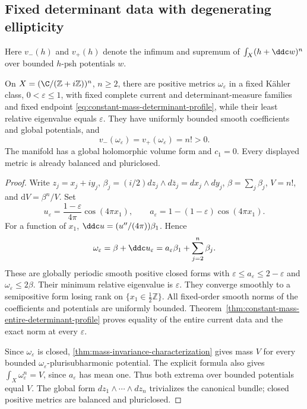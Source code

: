 \subsection{Fixed determinant data with degenerating ellipticity}
Here $v_-(h)$ and $v_+(h)$ denote the infimum and supremum of
$\int_X(h+\ddc w)^n$ over bounded $h$-psh potentials $w$.
\begin{theorem}\label{thm:fixed-determinant-closed-degeneration}
On $X=(\C/(\mathbb Z+i\mathbb Z))^n$, $n\geq2$, there
are positive metrics $\omega_\varepsilon$ in a fixed K\"ahler
class, $0<\varepsilon\leq1$, with fixed complete current and
determinant-measure families and fixed endpoint \eqref{eq:constant-mass-determinant-profile},
while their least relative eigenvalue equals $\varepsilon$.
They have uniformly bounded smooth coefficients and global
potentials, and
\[
 v_-(\omega_\varepsilon)=v_+(\omega_\varepsilon)=n!>0.
\]
The manifold has a global holomorphic volume form and $c_1=0$.
Every displayed metric is already balanced and pluriclosed.
\end{theorem}
\begin{proof}
Write $z_j=x_j+iy_j$,
$\beta_j=(i/2)dz_j\wedge d\bar z_j=dx_j\wedge dy_j$,
$\beta=\sum_j\beta_j$, $V=n!$, and $\mathrm dV=\beta^n/V$.
Set
\[
 u_\varepsilon=\frac{1-\varepsilon}{4\pi}\cos(4\pi x_1),
 \qquad a_\varepsilon=1-(1-\varepsilon)\cos(4\pi x_1).
\]
For a function of $x_1$, $\ddc u=(u''/(4\pi))\beta_1$.
Hence
\[
 \omega_\varepsilon=\beta+\ddc u_\varepsilon
 =a_\varepsilon\beta_1+\sum_{j=2}^n\beta_j.
\]
These are globally periodic smooth positive closed forms with
$\varepsilon\leq a_\varepsilon\leq2-\varepsilon$ and
$\omega_\varepsilon\leq2\beta$. Their minimum relative eigenvalue
is $\varepsilon$. They converge smoothly to a semipositive form
losing rank on $\{x_1\in\tfrac12\mathbb Z\}$.
All fixed-order smooth norms of the coefficients and potentials are
uniformly bounded. Theorem~\ref{thm:constant-mass-entire-determinant-profile} proves equality of the
entire current data and the exact norm at every $\varepsilon$.

Since $\omega_\varepsilon$ is closed, \cref{thm:mass-invariance-characterization} gives mass $V$ for every bounded $\omega_\varepsilon$-plurisubharmonic potential. The explicit formula also gives $\int_X\omega_\varepsilon^n=V$, since $a_\varepsilon$ has mean one.
Thus both extrema over bounded
potentials equal $V$. The global form
$dz_1\wedge\cdots\wedge dz_n$ trivializes the canonical bundle;
closed positive metrics are balanced and pluriclosed.
\end{proof}

